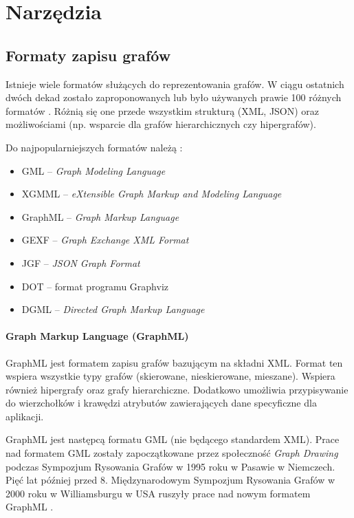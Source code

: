 \chapter{Narzędzia}
\section{Formaty zapisu grafów} \label{sec:graph-formats}
Istnieje wiele formatów służących do reprezentowania grafów. W ciągu ostatnich dwóch dekad zostało zaproponowanych lub było używanych prawie 100 różnych formatów \cite{roughan-tuke}. Różnią się one przede wszystkim strukturą (XML, JSON) oraz możliwościami (np. wsparcie dla grafów hierarchicznych czy hipergrafów).

Do najpopularniejszych formatów należą \cite{bernard,gephi}:

\begin{itemize}
\setlength\itemsep{0em}
\item GML -- \textit{Graph Modeling Language }
\item XGMML -- \textit{eXtensible Graph Markup and Modeling Language}
\item GraphML -- \textit{Graph Markup Language}
\item GEXF -- \textit{Graph Exchange XML Format}
\item JGF -- \textit{JSON Graph Format}
\item DOT -- format programu Graphviz
\item DGML -- \textit{Directed Graph Markup Language}
\end{itemize}

\subsubsection{Graph Markup Language (GraphML)}

GraphML jest formatem zapisu grafów bazującym na składni XML. Format ten wspiera wszystkie typy grafów (skierowane, nieskierowane, mieszane). Wspiera również hipergrafy oraz grafy hierarchiczne. Dodatkowo umożliwia przypisywanie do wierzchołków i krawędzi atrybutów zawierających dane specyficzne dla aplikacji.

GraphML jest następcą formatu GML (nie będącego standardem XML). Prace nad formatem GML zostały zapoczątkowane przez społeczność \textit{Graph Drawing} podczas Sympozjum Rysowania Grafów w 1995 roku w Pasawie w Niemczech. Pięć lat później przed 8. Międzynarodowym Sympozjum Rysowania Grafów w 2000 roku w Williamsburgu w USA ruszyły prace nad nowym formatem GraphML \cite{graphml}.

